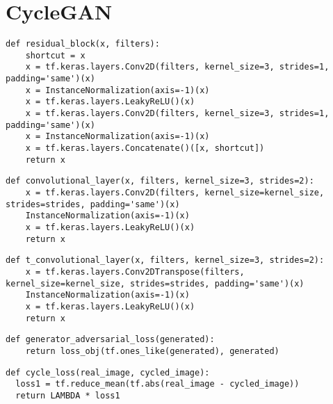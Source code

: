 \newpage
\section*{CycleGAN}
\begin{lstlisting}[language=pyhaff, caption={Residualblock Implementierung}, label={cod:residual}]
def residual_block(x, filters):
    shortcut = x
    x = tf.keras.layers.Conv2D(filters, kernel_size=3, strides=1, padding='same')(x)
    x = InstanceNormalization(axis=-1)(x)
    x = tf.keras.layers.LeakyReLU()(x)
    x = tf.keras.layers.Conv2D(filters, kernel_size=3, strides=1, padding='same')(x)
    x = InstanceNormalization(axis=-1)(x)
    x = tf.keras.layers.Concatenate()([x, shortcut])
    return x
\end{lstlisting}

\begin{lstlisting}[language=pyhaff, caption={Convolutional Block in CycleGAN}, label={cod:cycleGANConvolutional}]
def convolutional_layer(x, filters, kernel_size=3, strides=2):
    x = tf.keras.layers.Conv2D(filters, kernel_size=kernel_size, strides=strides, padding='same')(x)
    InstanceNormalization(axis=-1)(x)
    x = tf.keras.layers.LeakyReLU()(x)
    return x
\end{lstlisting}

\newpage
\begin{lstlisting}[language=pyhaff, caption={Transpose Convolutional Block in CycleGAN}, label={cod:cycleGANTransposeConv}]
def t_convolutional_layer(x, filters, kernel_size=3, strides=2):
    x = tf.keras.layers.Conv2DTranspose(filters, kernel_size=kernel_size, strides=strides, padding='same')(x)
    InstanceNormalization(axis=-1)(x)
    x = tf.keras.layers.LeakyReLU()(x)
    return x
\end{lstlisting}

\begin{lstlisting}[language=pyhaff, caption={Adversarieller Verlust des Generators in CycleGAN}, label={cod:cycleGANadversarialLoss}]
def generator_adversarial_loss(generated):
    return loss_obj(tf.ones_like(generated), generated)
\end{lstlisting}

\begin{lstlisting}[language=pyhaff, caption={Zykluskonsistenz Verlust in CycleGAN}, label={cod:cycleLoss}]
def cycle_loss(real_image, cycled_image):
  loss1 = tf.reduce_mean(tf.abs(real_image - cycled_image))
  return LAMBDA * loss1
\end{lstlisting}

